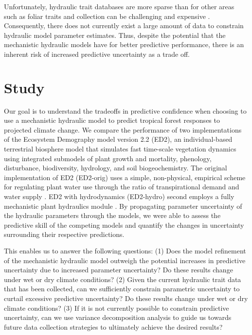 \documentclass[10pt]{article}
\begin{document}
Unfortunately, hydraulic trait databases are more sparse than for other areas such as foliar traits and collection can be challenging and expensive \citep{choat_2018}. Consequently, there does not currently exist a large amount of data to constrain hydraulic model parameter estimates. Thus, despite the potential that the mechanistic hydraulic models have for better predictive performance, there is an inherent risk of increased predictive uncertainty as a trade off.

\section*{Study}

Our goal is to understand the tradeoffs in predictive confidence when choosing to use a mechanistic hydraulic model to predict tropical forest responses to projected climate change. We compare the performance of two implementations of the Ecosystem Demography model version 2.2 (ED2), an individual-based terrestrial biosphere model that simulates fast  time-scale  vegetation dynamics using integrated submodels of plant growth and mortality, phenology, disturbance, biodiversity, hydrology, and soil biogeochemistry. The original implementation of ED2 (ED2-orig) uses a simple, non-physical, empirical scheme for regulating plant water use through the ratio of transpirational demand and water supply \citep{moorcroft_2001, medvigy_2009, longo_2019}. ED2 with hydrodynamics (ED2-hydro) second employs a fully mechanistic plant hydraulics module \citep{medvigy_2009, powell_2018, xu_2016, longo_2019}. By  propagating parameter uncertainty of the hydraulic parameters through the models, we were able to assess the predictive skill of the competing models and quantify the changes in uncertainty surrounding their respective predictions.

This enables us to answer the following questions: (1) Does the model refinement of the mechanistic hydraulic model outweigh the potential increases in predictive uncertainty due to increased parameter uncertainty? Do these results change under wet or dry climate conditions? (2) Given the current hydraulic trait data that has been collected, can we sufficiently constrain parametric uncertainty to curtail excessive predictive uncertainty? Do these results change under wet or dry climate conditions? (3) If it is not currently possible to constrain predictive uncertainty, can we use variance decomposition analysis to guide us towards future data collection strategies to ultimately achieve the desired results?
\end{document}
